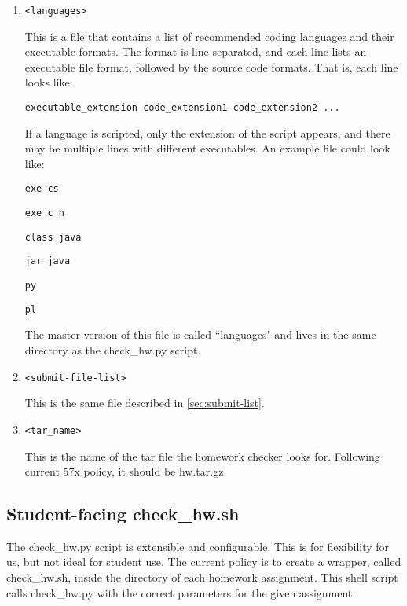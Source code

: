 \documentclass[12pt]{article}
\begin{document}
\begin{enumerate}
\item {\texttt{<languages>}

This is a file that contains a list of recommended coding languages and their executable formats. The format is line-separated, and each line lists an executable file format, followed by the source code formats. That is, each line looks like:

\texttt{executable\_extension code\_extension1 code\_extension2 ...}

If a language is scripted, only the extension of the script appears, and there may be multiple lines with different executables. An example file could look like:

\vspace{5pt}

\texttt{exe cs}

\texttt{exe c h}

\texttt{class java}

\texttt{jar java}

\texttt{py}

\texttt{pl}

\vspace{5pt}

The master version of this file is called ``languages" and lives in the same directory as the check\_hw.py script.

}
\item {\texttt{<submit-file-list>}

This is the same file described in \ref{sec:submit-list}.

}
\item {\texttt{<tar\_name>}

This is the name of the tar file the homework checker looks for. Following current 57x policy, it should be hw.tar.gz.
}
\end{enumerate}

\subsection{Student-facing check\_hw.sh}

The check\_hw.py script is extensible and configurable. This is for flexibility for us, but not ideal for student use. The current policy is to create a wrapper, called check\_hw.sh, inside the directory of each homework assignment. This shell script calls check\_hw.py with the correct parameters for the given assignment.
\end{document}
